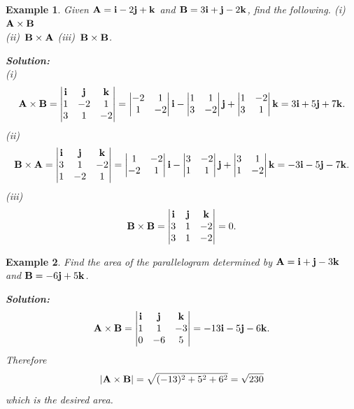 \documentclass[titlepage,a4paper,12pt]{report}
\newtheorem{example}{Example}[section]
\begin{document}
\begin{example}
Given ${\bf{A}}={\bf{i}}-2{\bf{j}}+{\bf{k}}$ and ${\bf{B}}=3{\bf{i}}+{\bf{j}}-2{\bf{k}}$, find the following. (i)\, ${\bf{A}\times \bf{B}}$ \\ (ii)\, ${\bf{B}\times \bf{A}}$ \quad (iii)\, ${\bf{B}\times \bf{B}}$.

\noindent \textbf{Solution:}\\
(i)\, \[{\bf{A}\times \bf{B}}=\begin{vmatrix}
{\bf{i}} & {\bf{j}} & {\bf{k}}\\
1 & -2 & 1\\
3 & 1 & -2
\end{vmatrix}=\begin{vmatrix}
-2 & 1\\
1 & -2
\end{vmatrix}{\bf{i}} -\begin{vmatrix}
1 & 1 \\
3 & -2
\end{vmatrix}{\bf{j}}+\begin{vmatrix}
1 & -2 \\
3 & 1
\end{vmatrix}{\bf{k}}=3{\bf{i}}+5{\bf{j}}+7{\bf{k}}.\]
(ii)\, \[{\bf{B}\times \bf{A}}=\begin{vmatrix}
{\bf{i}} & {\bf{j}} & {\bf{k}}\\
3 & 1 & -2\\
1 & -2 & 1
\end{vmatrix}=\begin{vmatrix}
1 & -2\\
-2 & 1
\end{vmatrix}{\bf{i}} -\begin{vmatrix}
3 & -2 \\
1 & 1
\end{vmatrix}{\bf{j}}+\begin{vmatrix}
3 & 1 \\
1 & -2
\end{vmatrix}{\bf{k}}=-3{\bf{i}}-5{\bf{j}}-7{\bf{k}}.\]
(iii)\, \[{\bf{B}\times \bf{B}}=\begin{vmatrix}
{\bf{i}} & {\bf{j}} & {\bf{k}}\\
3 & 1 & -2\\
3 & 1 & -2
\end{vmatrix}=0.\]
\end{example}
\begin{example}
Find the area of the parallelogram determined by ${\bf{A}}={\bf{i}}+{\bf{j}}-3{\bf{k}}$ and ${\bf{B}}=-6{\bf{j}}+5{\bf{k}}$.

\noindent \textbf{Solution:} \[{\bf{A}\times \bf{B}}=\begin{vmatrix}
{\bf{i}} & {\bf{j}} & {\bf{k}} \\
1 & 1 & -3\\
0 & -6 & 5 
\end{vmatrix} =-13{\bf{i}}-5{\bf{j}}-6{\bf{k}}.\] Therefore \[\left|{\bf{A}\times \bf{B}}\right|=\sqrt{(-13)^2+5^2+6^2}=\sqrt{230}\] which is the desired area.
\end{example}
\end{document}
